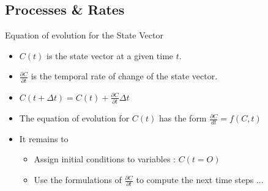 \documentclass[final,xcolor=dvipsnames]{beamer}
\begin{document}
      
      
      
            \subsection{Processes \& Rates}
      \begin{frame}
	\begin{block}{Equation of evolution for the State Vector}
	  \begin{itemize}
	    \item $C(t)$ is the state vector at a given time $t$.
	    \item $\frac{\partial C}{\partial t}$ is the temporal rate of change of the state vector. 
	    \item $C(t+\Delta t) = C(t) + \frac{\partial C}{\partial t}\Delta t$ 
	    \item The equation of evolution for $C(t)$ has the form  $\frac{\partial C}{dt} = f(C,t)$ 
	    \item It remains to 
	    \begin{itemize}
	     \item Assign initial conditions to variables : $C(t=O)$
	     \item Use the formulations of $\frac{\partial C}{\partial t}$ to compute the next time steps ... 
	    \end{itemize}

	  \end{itemize}
	\end{block}
      \end{frame}
      
\end{document}
